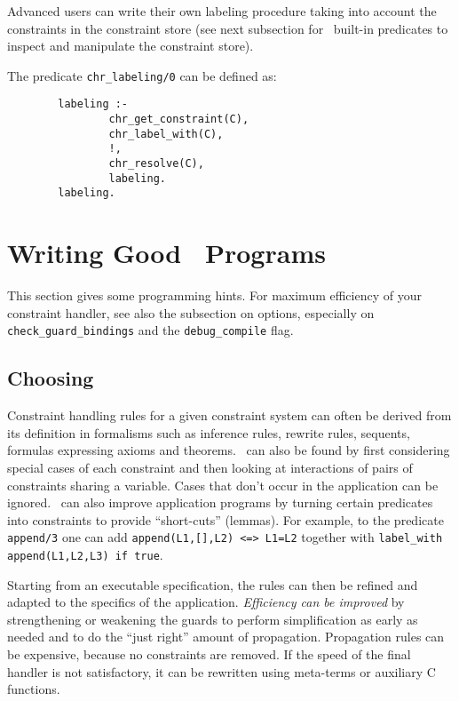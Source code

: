 Advanced users can write their own labeling procedure taking into
account the constraints in the constraint store (see next subsection
for \chr\ built-in predicates to inspect and manipulate the constraint
store). 

The predicate {\tt chr\_labeling/0} can be defined as: \begin{verbatim}
        labeling :-
                chr_get_constraint(C),
                chr_label_with(C),
                !,
                chr_resolve(C),
                labeling.
        labeling.
\end{verbatim}




\section{Writing Good \chr\ Programs}

This section gives some programming hints. For maximum efficiency of
your constraint handler, see also the subsection on options,
especially on {\tt check\_guard\_bindings} and the {\tt debug\_compile}
flag.

\subsection{Choosing \chrs}

Constraint handling rules for a given constraint system can often be
derived from its definition in formalisms such as inference rules,
rewrite rules, sequents, formulas expressing axioms and theorems.
%
\chrs\ can also be found by first considering
special cases of each constraint and then looking at interactions of
pairs of constraints sharing a variable. Cases that don't occur in the
application can be ignored.
%
\chrs\ can also improve application programs by turning
certain predicates into constraints to provide ``short-cuts''
(lemmas). For example, to the predicate {\tt append/3} one can add
{\tt append(L1,[],L2) <=> L1=L2} together with {\tt label\_with
append(L1,L2,L3) if true}.  

Starting from an executable specification, the rules can then be
refined and adapted to the specifics of the application. {\em
Efficiency can be improved} by strengthening or weakening the guards to
perform simplification as early as needed and to do the ``just right''
amount of propagation.  Propagation rules can be expensive, because no
constraints are removed.  If the speed of the final handler is not
satisfactory, it can be rewritten using meta-terms or auxiliary C
functions.

